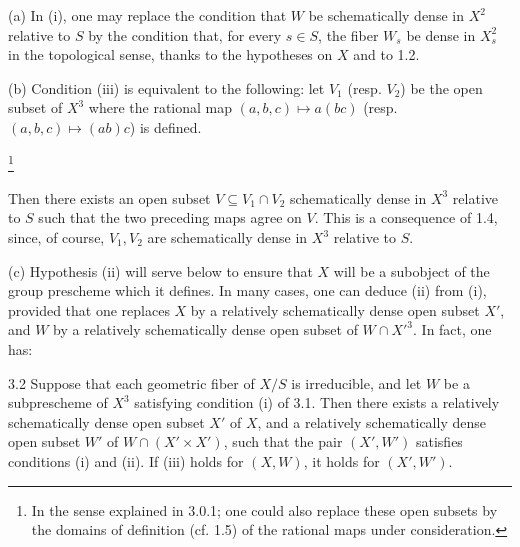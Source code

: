 \begin{remarks}{}
(a) In (i), one may replace the
condition that \(W\) be schematically
dense in \(X^2\) relative to \(S\)
by the condition that, for every
\(s\in S\), the fiber \(W_s\) be
dense in \(X_s^2\) in the topological
sense, thanks to the hypotheses on \(X\) and to 1.2.

(b) Condition (iii) is equivalent
to the following:
let \(V_1\) (resp. \(V_2\)) be the
open subset of \(X^3\) where the
rational map \((a,b,c)\mapsto a(bc)\)
(resp. \((a,b,c)\mapsto(ab)c\))
is defined.
{\renewcommand{\thefootnote}{(*)}\addtocounter{footnote}{-1}%
\footnote{In the sense explained in 3.0.1;
one could also replace these open subsets
by the domains of definition (cf. 1.5)
of the rational maps under consideration.}}
Then there exists an open subset
\(V\subseteq V_1\cap V_2\) schematically
dense in \(X^3\) relative to \(S\)
such that the two preceding maps
agree on \(V\).
This is a consequence of 1.4,
since, of course, \(V_1,V_2\)
are schematically dense in \(X^3\)
relative to \(S\).

(c) Hypothesis (ii) will serve
below to ensure that \(X\) will
be a subobject of the group
prescheme which it defines.
In many cases, one can deduce
(ii) from (i), provided that
one replaces \(X\) by a relatively
schematically dense open subset
\(X'\), and \(W\) by a relatively
schematically dense open subset
of \(W\cap X'^3\).
In fact, one has:
\end{remarks}
\begin{proposition}{3.2}\label{XVIII.3.2}
Suppose that each geometric fiber
of \(X/S\) is irreducible, and
let \(W\) be a subprescheme of
\(X^3\) satisfying condition
(i) of 3.1.
Then there exists a relatively
schematically dense open subset
\(X'\) of \(X\), and a relatively
schematically dense open subset
\(W'\) of \(W\cap(X'\times X')\),
such that the pair \((X',W')\)
satisfies conditions (i) and (ii).
If (iii) holds for \((X,W)\),
it holds for \((X',W')\).
\end{proposition}
